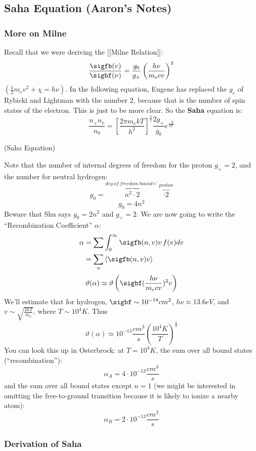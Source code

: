 \documentclass{article}
\def\hf{\frac12}
\def\mean#1{\left\langle {#1}\right\rangle}
\def\e#1{\cdot10^{#1}}
\def\hf{\frac12}
\begin{document}
\subsection{Saha Equation (Aaron's Notes)}

\subsubsection{More on Milne }
Recall that we were deriving the [[Milne Relation]]:
$$\frac{\sigfb(v)}{\sigbf(\nu)}=\frac{g_0}{ g_+}\left(\frac{h\nu}{ m_ecv}\right)^2$$
$(\hf m_ev^2+\chi=h\nu)$.  In the following equation, Eugene has replaced
the $g_e$ of Rybicki and Lightman with the number $2$, because that is the
number of spin states of the electron.  This is just to be more clear.  So
the {\bf Saha} equation is:
$$\frac{n_+n_e}{ n_0}=\left[\frac{2\pi m_ekT}{ h^2}\right]^\frac{3}{2}\frac{2g_+}{
g_0}e^\frac{-\chi}{ kT}$$
\centerline{(Saha Equation)}
Note that the number of internal degrees of freedom for the proton $g_+=2$, and
the number for neutral hydrogen:
$$g_0=\overbrace{n^2\cdot2}^{deg\ of\ freedom\ bound\ e^-}\overbrace{\cdot2}
^{proton}$$
$$g_0=4n^2$$
Beware that Shu says $g_0=2n^2$ and $g_+=2$.  We are now going to write the
``Recombination Coefficient'' $\alpha$:
$$\begin{aligned}\alpha&=\sum{\int_0^\infty{\sigfb(n,v)v\,f(v)dv}}\\ 
&=\sum_n{\mean{\sigfb(n,v)v}}\\ \end{aligned}$$
$$\vartheta(\alpha)\simeq\vartheta\left(\sigbf(\frac{h\nu}{ m_ecv})^2v\right)$$
We'll estimate that for hydrogen, $\sigbf\sim10^{-18} cm^2$, $h\nu\approx
13.6eV$, and $v\sim\sqrt{\frac{2kT}{ m_e}}$, where $T\sim10^4K$.  Thus
$$\vartheta(\alpha)\simeq10^{-13}\frac{cm^3}{ s}\left(\frac{10^4K}{ T}\right)^\hf$$
You can look this up in Osterbrock: at $T=10^4K$, the sum over all bound
states (``recombination''):
$$\alpha_A=4\e{-13}\frac{cm^3}{ s}$$
and the sum over all bound states except $n=1$ (we might be interested in
omitting the free-to-ground transition because it is likely to ionize
a nearby atom):
$$\alpha_B=2\e{-13}\frac{cm^3}{ s}$$

\subsubsection{ Derivation of Saha}
\end{document}
